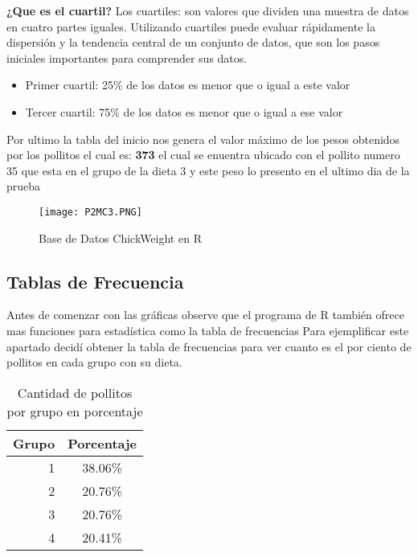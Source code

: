 \documentclass{article}
\begin{document}
\textbf{¿Que es el cuartil?}
\newline
Los cuartiles: son valores que dividen una muestra de datos en cuatro partes iguales. Utilizando cuartiles puede evaluar rápidamente la dispersión y la tendencia central de un conjunto de datos, que son los pasos iniciales importantes para comprender sus datos.

\begin{itemize}
    \item Primer cuartil: 25\% de los datos es menor que o igual a este valor
    \item Tercer cuartil: 75\% de los datos es menor que o igual a ese valor
\end{itemize} 

Por ultimo la tabla del inicio nos genera el valor máximo de los pesos obtenidos por los pollitos el cual es: \textbf{373} el cual se enuentra ubicado con el pollito numero 35 que esta en el grupo de la dieta 3 y este peso lo presento en el ultimo dia de la prueba

\begin{figure}[h]
    \centering
    \texttt{[image: P2MC3.PNG]}
    \caption{Base de Datos ChickWeight en R }
    \label{fig:mesh3}
\end{figure}


\newpage
\subsection{Tablas de Frecuencia}
Antes de comenzar con las gráficas observe que el programa de R también ofrece mas funciones para estadística como la tabla de frecuencias
\newline
Para ejemplificar este apartado decidí obtener la tabla de frecuencias para ver cuanto es el por ciento de pollitos en cada grupo con su dieta.
\begin{table}[h]
\begin{center}
\begin{tabular}{| r  | c |}
Grupo & Porcentaje  \\ \hline
1 & 38.06\%  \\
2 & 20.76\%  \\
3 & 20.76\%  \\
4 & 20.41\%  \\ \hline
\end{tabular}
\caption{Cantidad de pollitos por grupo en porcentaje}
\label{tab:cantidad}
\end{center}
\end{table}
\end{document}
